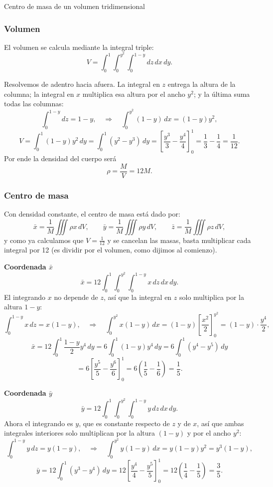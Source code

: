 \begin{solucion}{Centro de masa de un volumen tridimensional}
\subsubsection*{Volumen}

El volumen se calcula mediante la integral triple:
\[
V = \int_0^1 \int_0^{y^2} \int_0^{1 - y} dz\,dx\,dy.
\]

Resolvemos de adentro hacia afuera. La integral en $z$ entrega la altura de la columna; la integral en $x$ multiplica esa altura por el ancho $y^2$; y la última suma todas las columnas:
\[
\int_0^{1 - y} dz = 1 - y,
\quad \Rightarrow \quad
\int_0^{y^2} (1 - y)\,dx = (1 - y)y^2,
\]
\[
V=\int_0^1 (1 - y)y^2\,dy = \int_0^1 (y^2 - y^3)\,dy
= \left[ \frac{y^3}{3} - \frac{y^4}{4} \right]_0^1 = \frac{1}{3} - \frac{1}{4} = \frac{1}{12}.
\]
Por ende la densidad del cuerpo será
$$\rho=\dfrac{M}{V}=12M .$$

\subsubsection*{Centro de masa}

Con densidad constante, el centro de masa está dado por:
\[
\bar{x} = \frac{1}{M} \iiint \rho x\,dV, \qquad
\bar{y} = \frac{1}{M} \iiint \rho y\,dV, \qquad
\bar{z} = \frac{1}{M} \iiint\rho z\,dV,
\]
y como ya calculamos que \( V = \frac{1}{12} \) y se cancelan las masas, basta multiplicar cada integral por 12 (es dividir por el volumen, como dijimos al comienzo).

\textbf{Coordenada $\bar{x}$}\\
\[
\bar{x} = 12 \int_0^1 \int_0^{y^2} \int_0^{1 - y} x \, dz\,dx\,dy.
\]
El integrando $x$ no depende de $z$, así que la integral en $z$ solo multiplica por la altura $1-y$:
\[
\int_0^{1 - y} x\,dz = x(1 - y),
\quad \Rightarrow \quad
\int_0^{y^2} x(1 - y)\,dx = (1 - y) \left[ \frac{x^2}{2} \right]_0^{y^2} = (1 - y) \cdot \frac{y^4}{2},
\]
\[
\bar{x} = 12 \int_0^1 \frac{1 - y}{2} y^4\,dy
= 6 \int_0^1 (1 - y)y^4\,dy = 6 \int_0^1 (y^4 - y^5)\,dy
\]
\[
= 6 \left[ \frac{y^5}{5} - \frac{y^6}{6} \right]_0^1
= 6 \left( \frac{1}{5} - \frac{1}{6} \right)
= \frac{1}{5}.
\]

\textbf{Coordenada $\bar{y}$}\\
\[
\bar{y} = 12 \int_0^1 \int_0^{y^2} \int_0^{1 - y} y\,dz\,dx\,dy.
\]
Ahora el integrando es $y$, que es constante respecto de $z$ y de $x$, así que ambas integrales interiores solo multiplican por la altura $(1-y)$ y por el ancho $y^2$:
\[
\int_0^{1 - y} y\,dz = y(1 - y),
\quad \Rightarrow \quad
\int_0^{y^2} y(1 - y)\,dx = y(1 - y)y^2 = y^3(1 - y),
\]
\[
\bar{y} = 12 \int_0^1 (y^3 - y^4)\,dy
= 12 \left[ \frac{y^4}{4} - \frac{y^5}{5} \right]_0^1 = 12 \left( \frac{1}{4} - \frac{1}{5} \right)
= \frac{3}{5}.
\]


\end{solucion}
